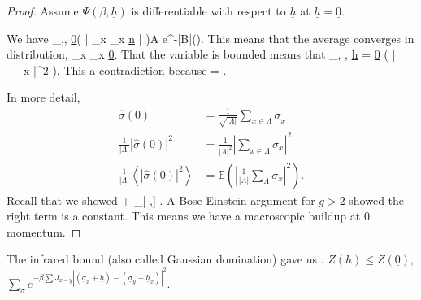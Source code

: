 \documentclass[12pt]{book}
\theoremstyle{norm}
\begin{document}
\begin{proof}
Assume $\Psi(\beta, \underline{h})$ is differentiable with respect to $\underline{h}$ at $\underline{h}=\underline{0}$. 

We have 
\be
{}_{\Lambda,\beta, \underline{0}}\left( {
\left| {\sum_{x\in \Lambda} \underline{\sigma}_x \cdot \underline{n}\ge \varepsilon 
} \right|} \right)\le A e^{-|B|\delta(\varepsilon)}.
\ee
This means that the average converges in distribution,
\be
{}\sum_{x\in \Lambda} \underline{\sigma}_x  \underline{0}.
\ee
That the variable is bounded means that
\be
{}_{\Lambda, \beta, \underline{h} = \underline{0}} \left( {\left| { \sum_\Lambda \underline{\sigma}_x} \right|^2} \right).
\ee
This a contradiction because 
\be
\left{}\right\rangle =  \sigma.
\ee

In more detail,
\begin{align}
\widehat{\underline{\sigma}}(0)& = \frac{1}{\sqrt{|\Lambda|}} \sum_{x\in \Lambda} \underline{\sigma}_x\\
\frac{1}{|\Lambda|}|\widehat{\sigma}(0)|^2 &= \frac{1}{|\Lambda|^2} \left| {\sum_{x\in \Lambda} \sigma_x} \right|^2\\
\frac{1}{|\Lambda|} \left\langle {|\widehat{\sigma}(0)|^2}\right\rangle &= \mathbb{E}\left( {\left| {\frac{1}{|\Lambda|} \sum_\Lambda \sigma_x} \right|^2} \right).
\end{align}
Recall that we showed
\le {} \left{}\right\rangle +  \int_{[-\pi,\pi]}  .
\ee
A Bose-Einstein argument for $g>2$ showed the right term is a constant. This means we have a macroscopic buildup at 0 momentum.
\end{proof}


The infrared bound (also called Gaussian domination) gave us
\be
\left{}\right\rangle \le {}.
\ee
$Z(h)\le Z(\underline{0})$, $\sum_\sigma e^{-\beta \sum J_{x-y} |(\underline{\sigma}_x + \underline{h})- (\underline{\sigma}_y+\underline{h}_x)|^2}$.
\end{document}
